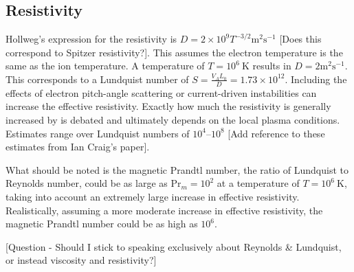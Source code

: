 \subsection{Resistivity}

Hollweg's expression for the resistivity is $D = 2 \times 10^{9} T^{-3/2} \text{m}^2 \text{s}^{-1}$ [Does this correspond to Spitzer resistivity?]. This assumes the electron temperature is the same as the ion temperature. A temperature of $T=10^6\ \text{K}$ results in $D = 2 \text{m}^2 \text{s}^{-1}$. This corresponds to a Lundquist number of $S = \frac{V_A L_0}{D} = 1.73 \times 10^{12}$. Including the effects of electron pitch-angle scattering or current-driven instabilities can increase the effective resistivity. Exactly how much the resistivity is generally increased by is debated and ultimately depends on the local plasma conditions. Estimates range over Lundquist numbers of $10^{4}$--$10^{8}$ [Add reference to these estimates from Ian Craig's paper].

What should be noted is the magnetic Prandtl number, the ratio of Lundquist to Reynolds number, could be as large as $\text{Pr}_m = 10^2$ at a temperature of $T=10^6\ \text{K}$, taking into account an extremely large increase in effective resistivity. Realistically, assuming a more moderate increase in effective resistivity, the magnetic Prandtl number could be as high as $10^{6}$.

[Question - Should I stick to speaking exclusively about Reynolds \& Lundquist, or instead viscosity and resistivity?]
